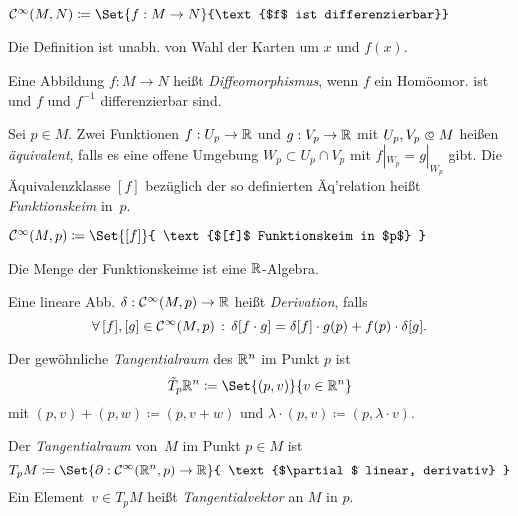 \documentclass{cheat-sheet}
\newcommand{\Cont}{\mathcal{C}} %
\begin{document}
\begin{nota}
  $\Cont^\infty(M, N) \coloneqq \Set{f : M \to N}{\text{$f$ ist differenzierbar}}$
\end{nota}

\begin{bem}
  Die Definition ist unabh. von Wahl der Karten um $x$ und $f(x)$.
\end{bem}

\begin{defn}
  Eine Abbildung $f : M \to N$ heißt \emph{Diffeomorphismus}, wenn $f$ ein Homöomor. ist und $f$ und $f^{-1}$ differenzierbar sind.
\end{defn}


\begin{defn}
  Sei $p \in M$. Zwei Funktionen $f : U_p \to \mathbb{R}$ und $g : V_p \to \mathbb{R}$ mit $U_p, V_p \opn M$ heißen \textit{äquivalent}, falls es eine offene Umgebung $W_p \subset U_p \cap V_p$ mit $f|_{W_p} = g|_{W_p}$ gibt. Die Äquivalenzklasse $[f]$ bezüglich der so definierten Äq'relation heißt \emph{Funktionskeim} in~$p$.
\end{defn}

\begin{nota}
  $\Cont^\infty(M, p) \coloneqq \Set{ [f] }{ \text{$[f]$ Funktionskeim in $p$} }$
\end{nota}

\begin{bem}
  Die Menge der Funktionskeime ist eine $\mathbb{R}$-Algebra.
\end{bem}

\begin{defn}
  Eine lineare Abb. $\delta : \Cont^\infty(M, p) \to \R$ heißt \emph{Derivation}, falls
  \[ \fa{[f], [g] \in \Cont^\infty(M, p)} \delta[f \cdot g] = \delta[f] \cdot g(p) + f(p) \cdot \delta[g]. \]
\end{defn}

\begin{defn}
  Der gewöhnliche \textit{Tangentialraum} des $\mathbb{R}^n$ im Punkt $p$ ist
  \[ \tilde{T}_p \R^n \coloneqq \Set{(p, v)}{v \in \R^n} \]
  mit $(p, v) + (p, w) \coloneqq (p, v + w)$ und $\lambda \cdot (p, v) \coloneqq (p, \lambda \cdot v)$.
\end{defn}

\begin{defn}
  Der \emph{Tangentialraum} von~$M$ im Punkt $p \in M$ ist
  \[ T_p M \coloneqq \Set{ \partial : \Cont^\infty(\R^n, p) \to \R }{ \text{$\partial$ linear, derivativ} } \]
  Ein Element~$v \in T_p M$ heißt \emph{Tangentialvektor} an $M$ in $p$.
\end{defn}
\end{document}
